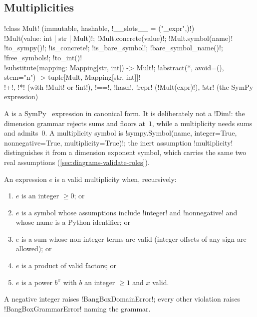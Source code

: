 \subsection{Multiplicities}

\begin{signature}
\py!class Mult! (immutable, hashable, \py!__slots__ = ("_expr",)!)\\
\quad \py!Mult(value: int | str | Mult)!; \py!Mult.concrete(value)!; \py!Mult.symbol(name)!\\
\quad \py!to_sympy()!; \py!is_concrete!; \py!is_bare_symbol!; \py!bare_symbol_name()!; \py!free_symbols!; \py!to_int()!\\
\quad \py!substitute(mapping: Mapping[str, int]) -> Mult!; \py!abstract(*, avoid=(), stem="n") -> tuple[Mult, Mapping[str, int]]!\\
\quad \py!+!, \py!*! (with \py!Mult! or \py!int!), \py!==!, \py!hash!, \py!repr! (\code!Mult(expr)!), \py!str! (the SymPy expression)
\end{signature}

A  is a SymPy~\cite{meurer2017sympy} expression in canonical form. It is deliberately not a \py!Dim!: the dimension grammar rejects sums and floors at~$1$, while a multiplicity needs sums and admits~$0$. A multiplicity symbol is \py!sympy.Symbol(name, integer=True, nonnegative=True, multiplicity=True)!; the inert assumption \code!multiplicity! distinguishes it from a dimension exponent symbol, which carries the same two real assumptions (\cref{sec:diagrams-validate-roles}).

\begin{definition}\label{def:diagrams-mult-grammar}
An expression $e$ is a valid multiplicity when, recursively:
\begin{enumerate}
\item $e$ is an integer $\ge 0$; or
\item $e$ is a symbol whose assumptions include \code!integer! and \code!nonnegative! and whose name is a Python identifier; or
\item $e$ is a sum whose non-integer terms are valid (integer offsets of any sign are allowed); or
\item $e$ is a product of valid factors; or
\item $e$ is a power $b^{x}$ with $b$ an integer $\ge 1$ and $x$ valid.
\end{enumerate}
A negative integer raises \py!BangBoxDomainError!; every other violation raises \py!BangBoxGrammarError! naming the grammar.
\end{definition}

